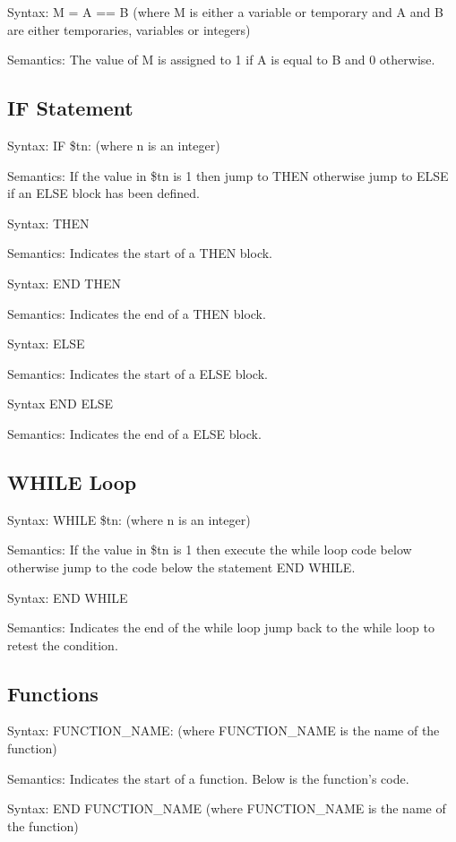\documentclass{article}
\begin{document}
	Syntax: M = A == B (where M is either a variable or temporary and A and B are either temporaries, variables or integers) 
	
	Semantics: The value of M is assigned to 1 if A is equal to B and 0 otherwise.
	
	
	
	\subsection{IF Statement}
	
	Syntax: IF \$tn: (where n is an integer) 
	
	Semantics: If the value in \$tn is 1 then jump to THEN otherwise jump to ELSE if an ELSE block has been defined. 
	
	Syntax: THEN
	
	Semantics: Indicates the start of a THEN block.
	
	Syntax: END THEN
	
	Semantics: Indicates the end of a THEN block.
	
	Syntax: ELSE
	
	Semantics: Indicates the start of a ELSE block. 
	
	Syntax END ELSE
	
	Semantics: Indicates the end of a ELSE block. 
	
	\subsection{WHILE Loop}
	
	Syntax: WHILE \$tn: (where n is an integer)
	
	Semantics: If the value in \$tn is 1 then execute the while loop code below otherwise jump to the code below the statement END WHILE. 
	
	Syntax: END WHILE
	
	Semantics: Indicates the end of the while loop jump back to the while loop to retest the condition. 
	
	\subsection{Functions}
	
	Syntax: FUNCTION\_NAME: (where FUNCTION\_NAME is the name of the function)
	
	Semantics: Indicates the start of a function. Below is the function's code. 
	
	Syntax: END FUNCTION\_NAME (where FUNCTION\_NAME is the name of the function)
	
\end{document}
